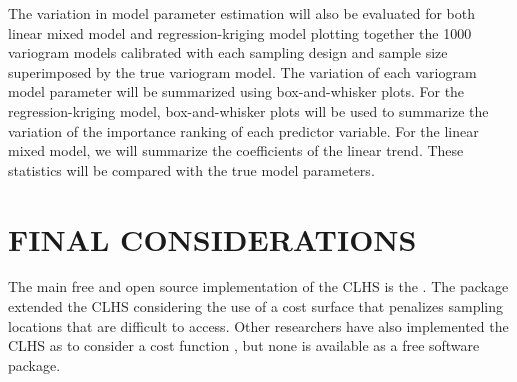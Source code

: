 The variation in model parameter estimation will also be evaluated for both linear mixed model and 
regression-kriging model plotting together the 1000 variogram models calibrated with each sampling design and 
sample size superimposed by the true variogram model. The variation of each variogram model parameter will be 
summarized using box-and-whisker plots. For the regression-kriging model, box-and-whisker plots will be used 
to summarize the variation of the importance ranking of each predictor variable. For the linear mixed model, 
we will summarize the coefficients of the linear trend. These statistics will be compared with the true model 
parameters.

\section{FINAL CONSIDERATIONS}

The main free and open source implementation of the CLHS is the  \cite{RoudierEtAl2012}. The 
package extended the CLHS considering the use of a cost surface that penalizes sampling locations that are 
difficult to access. Other researchers have also implemented the CLHS as to consider a cost function 
\cite{MulderEtAl2013, CliffordEtAl2014}, but none is available as a free software package.
